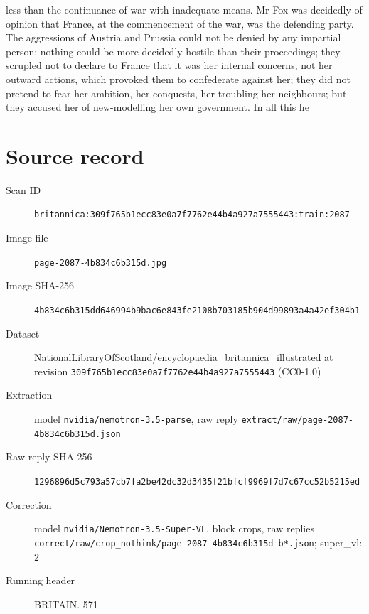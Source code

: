 \documentclass{article}
\begin{document}
less than the continuance of war with inadequate means. Mr Fox was decidedly of opinion that France, at the commencement of the war, was the defending party. The aggressions of Austria and Prussia could not be denied by any impartial person: nothing could be more decidedly hostile than their proceedings; they scrupled not to declare to France that it was her internal concerns, not her outward actions, which provoked them to confederate against her; they did not pretend to fear her ambition, her conquests, her troubling her neighbours; but they accused her of new-modelling her own government. In all this he


\section*{Source record}
\begin{description}
\item[Scan ID] \texttt{britannica:309f765b1ecc83e0a7f7762e44b4a927a7555443:train:2087}
\item[Image file] \texttt{page-2087-4b834c6b315d.jpg}
\item[Image SHA-256] \texttt{4b834c6b315dd646994b9bac6e843fe2108b703185b904d99893a4a42ef304b1}
\item[Dataset] NationalLibraryOfScotland/encyclopaedia\_britannica\_illustrated at revision \texttt{309f765b1ecc83e0a7f7762e44b4a927a7555443} (CC0-1.0)
\item[Extraction] model \texttt{nvidia/nemotron-3.5-parse}, raw reply \texttt{extract/raw/page-2087-4b834c6b315d.json}
\item[Raw reply SHA-256] \texttt{1296896d5c793a57cb7fa2be42dc32d3435f21bfcf9969f7d7c67cc52b5215ed}
\item[Correction] model \texttt{nvidia/Nemotron-3.5-Super-VL}, block crops, raw replies \texttt{correct/raw/crop\_nothink/page-2087-4b834c6b315d-b*.json}; super\_vl: 2
\item[Running header] BRITAIN. 571
\end{description}
\end{document}
